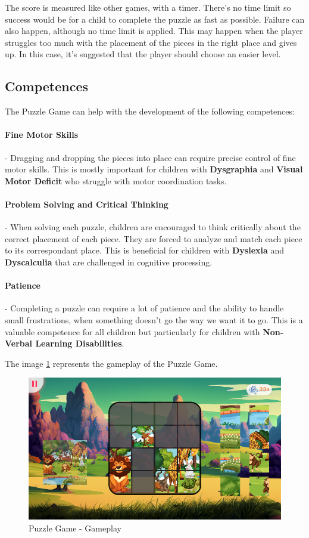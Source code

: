 The score is measured like other games, with a timer. There's no time limit so success would be for a child to complete the puzzle as fast as possible. Failure can also happen, although no time limit is applied. This may happen when the player struggles too much with the placement of the pieces in the right place and gives up. In this case, it's suggested that the player should choose an easier level.

\subsection*{Competences}

The Puzzle Game can help with the development of the following competences:

\paragraph{Fine Motor Skills}- Dragging and dropping the pieces into place can require precise control of fine motor skills. This is mostly important for children with \textbf{Dysgraphia} and \textbf{Visual Motor Deficit} who struggle with motor coordination tasks.

\paragraph{Problem Solving and Critical Thinking}- When solving each puzzle, children are encouraged to think critically about the correct placement of each piece. They are forced to analyze and match each piece to its correspondant place. This is beneficial for children with \textbf{Dyslexia} and \textbf{Dyscalculia} that are challenged in cognitive processing.

\paragraph{Patience}- Completing a puzzle can require a lot of patience and the ability to handle small frustrations, when something doesn't go the way we want it to go. This is a valuable competence for all children but particularly for children with \textbf{Non-Verbal Learning Disabilities}.

The image \ref{fig:puzzleGameplay} represents the gameplay of the Puzzle Game.

\begin{figure}[H]
    \centering
    \includegraphics[scale=0.45]{Chapters/gameplay/PuzzleGame.jpg}
    \caption{Puzzle Game - Gameplay}
    \label{fig:puzzleGameplay}    
\end{figure}